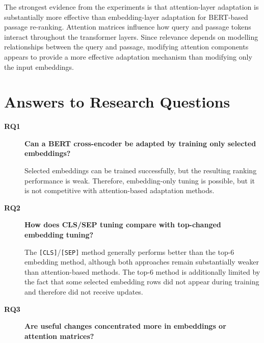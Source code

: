 The strongest evidence from the experiments is that attention-layer adaptation is substantially more effective than embedding-layer adaptation for BERT-based passage re-ranking. Attention matrices influence how query and passage tokens interact throughout the transformer layers. Since relevance depends on modelling relationships between the query and passage, modifying attention components appears to provide a more effective adaptation mechanism than modifying only the input embeddings.

\section{Answers to Research Questions}
\label{sec:results_rq}

\justifying

\begin{description}

\item[\textbf{RQ1}] \textbf{Can a BERT cross-encoder be adapted by training only selected embeddings?}

\vspace{-0.4\baselineskip}

Selected embeddings can be trained successfully, but the resulting ranking performance is weak. Therefore, embedding-only tuning is possible, but it is not competitive with attention-based adaptation methods.

\vspace{0.6\baselineskip}

\item[\textbf{RQ2}] \textbf{How does CLS/SEP tuning compare with top-changed embedding tuning?}

\vspace{-0.4\baselineskip}

The \texttt{[CLS]}/\texttt{[SEP]} method generally performs better than the top-6 embedding method, although both approaches remain substantially weaker than attention-based methods. The top-6 method is additionally limited by the fact that some selected embedding rows did not appear during training and therefore did not receive updates.

\vspace{0.6\baselineskip}

\item[\textbf{RQ3}] \textbf{Are useful changes concentrated more in embeddings or attention matrices?}

\vspace{-0.4\baselineskip}


\end{description}

